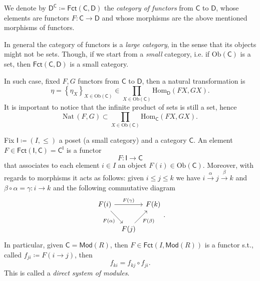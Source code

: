 \begin{defn}
	We denote by $\mathsf{D}^{\mathsf{C}} \coloneqq \mathsf{Fct}\left(\mathsf{C}, \mathsf{D} \right)$ the {\em category of functors} from $\mathsf{C}$ to $\mathsf{D}$,
	whose elements are functors $F\colon \mathsf{C} \to \mathsf{D}$ and whose morphisms are the above mentioned morphisms of functors.
\end{defn}

\begin{rem}
	In general the category of functors is a {\em large category}, in the sense that its objects might not be sets.
	Though, if we start from a {\em small} category, i.e. if $\mathrm{Ob} \left(\mathsf{C}\right)$ is a set,
	then $\mathsf{Fct}\left(\mathsf{C}, \mathsf{D} \right) $ is a small category.

	In such case, fixed $F, G$ functors from $\mathsf{C}$ to $\mathsf{D}$, then a natural transformation is
	\begin{equation}
	\eta = \left\{ \eta_X \right\}_{X \in \mathrm{Ob} \left(\mathsf{C}\right)} \in \prod_{X \in \mathrm{Ob} \left(\mathsf{C}\right)} \mathrm{Hom}_{\mathsf{D}} \left( FX, GX \right)
	.\end{equation} 
	It is important to notice that the infinite product of sets is still a set, hence
	\begin{equation}
	\mathrm{Nat}\, \left(F, G\right) \subset \prod_{X \in \mathrm{Ob} \left(\mathsf{C}\right)} \mathrm{Hom}_{\mathsf{C}} \left( FX, GX \right)
	.\end{equation} 
\end{rem}

\begin{ex}
	Fix $\mathsf{I} \coloneqq \left(I, \le\right)$ a poset (a small category) and a category $\mathsf{C}$.
	An element $F \in \mathsf{Fct}\left(\mathsf{I}, \mathsf{C} \right) = \mathsf{C}^{\mathsf{I}}$ is a functor
	\begin{equation}
	F\colon \mathsf{I} \to \mathsf{C}
	\end{equation} 
	that associates to each element $i \in I$ an object $F(i) \in \mathrm{Ob} \left(\mathsf{C}\right)$.
	Moreover, with regards to morphisms it acts as follows: given $i \leq j \le k$ we have $i \xrightarrow{\alpha} j \xrightarrow{\beta} k$ and $\beta \circ \alpha = \gamma \colon i \to k$ and the following commutative diagram
	\begin{equation}
	\begin{tikzcd}[column sep=tiny]
		F(i) \arrow[rr, "F(\gamma)", rightarrow] \arrow[rd, "F(\alpha)"', rightarrow] & & F(k)\\
			& F(j) \arrow[ru, "F(\beta)"', rightarrow] &
	\end{tikzcd}
	.\end{equation} 
	In particular, given $\mathsf{C} = \mathsf{Mod}\left( R \right)$, then $F \in \mathsf{Fct}\left(I, \mathsf{Mod}\left( R \right) \right)$ is a functor s.t., called $f_{ji} \coloneqq F( i \to j)$, then
	\begin{equation}
		f_{ki} = f_{kj} \circ f_{ji}
	.\end{equation} 
	This is called a {\em direct system of modules}.
\end{ex} 

